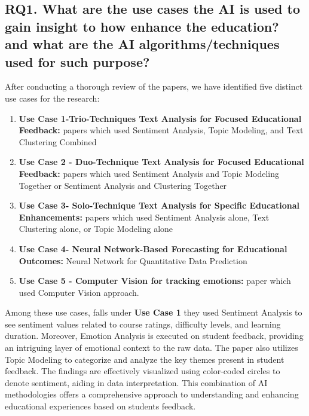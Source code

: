 \subsection{\textbf{RQ1.  What are the use cases the AI is used to gain insight to how enhance the education? and what are the AI algorithms/techniques used for such purpose?}} \label{RQ1_analysis}


\begin{flushleft}
After conducting a thorough review of the papers, we have identified five distinct use cases for the research:
\end{flushleft}

\begin{enumerate}
\item \textbf{Use Case 1-Trio-Techniques Text Analysis for Focused Educational Feedback:} papers which used Sentiment Analysis, Topic Modeling, and Text Clustering Combined
\item \textbf{Use Case 2 - Duo-Technique Text Analysis for Focused Educational Feedback:} papers which used Sentiment Analysis and Topic Modeling Together or Sentiment Analysis and Clustering Together
\item \textbf{Use Case 3- Solo-Technique Text Analysis for Specific Educational Enhancements: }papers which used Sentiment Analysis alone, Text Clustering alone, or Topic Modeling alone
\item \textbf{Use Case 4- Neural Network-Based Forecasting for Educational Outcomes:} Neural Network for Quantitative Data Prediction
\item \textbf{Use Case 5 - Computer Vision for tracking emotions:} paper which used Computer Vision approach. 
\end{enumerate}

Among these use cases, \cite{Palaute:_An_Online_Text_Mining_Tool_for_Analyzing_Written_Student_Course_Feedback} falls under \textbf{Use Case 1} they used Sentiment Analysis  to see sentiment values related to course ratings, difficulty levels, and learning duration. Moreover, Emotion Analysis is executed on student feedback, providing an intriguing layer of emotional context to the raw data. The paper also utilizes Topic Modeling to categorize and analyze the key themes present in student feedback. The findings are effectively visualized using color-coded circles to denote sentiment, aiding in data interpretation. This combination of AI methodologies offers a comprehensive approach to understanding and enhancing educational experiences based on students feedback.

